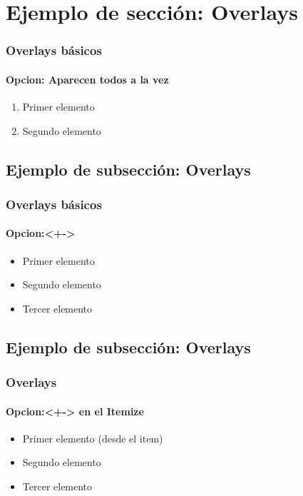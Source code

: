 \documentclass{beamer}
\begin{document}

  \section{Ejemplo de sección: Overlays} %
  \begin{frame}
    \frametitle{Overlays básicos} %
    \framesubtitle{Opcion: Aparecen todos a la vez}
    \begin{enumerate} %
      \item Primer elemento
      \item Segundo elemento
    \end{enumerate}
  \end{frame}


  \subsection{Ejemplo de subsección: Overlays} %
  \begin{frame}
    \frametitle{Overlays básicos} %
    \framesubtitle{Opcion:<+->}
    \begin{itemize}
      \item<+-> Primer elemento
      \item<+-> Segundo elemento
      \item<+-> Tercer elemento
    \end{itemize}
  \end{frame}


  \subsection{Ejemplo de subsección: Overlays} %
  \begin{frame}
    \frametitle{Overlays} %
    \framesubtitle{Opcion:<+-> en el Itemize}
    \begin{itemize}
      \item Primer elemento (desde el item)
      \item Segundo elemento
      \item Tercer elemento
    \end{itemize}
  \end{frame}
\end{document}
